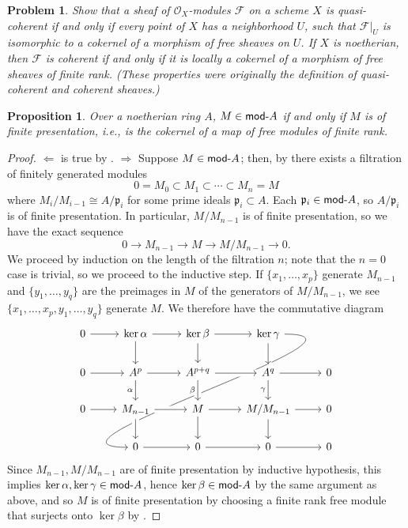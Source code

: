\documentclass[12pt,letterpaper]{article}
\newtheorem{problem}{Problem}[section]
\newtheorem{proposition}{Proposition}
\theoremstyle{definition}
\theoremstyle{remark}
\numberwithin{equation}{section}
\numberwithin{figure}{problem}
\newcommand{\FF}{\mathscr{F}}
\newcommand{\OO}{\mathcal{O}}
\newcommand{\Mod}{\mathsf{mod}\mathchar`-}
\begin{document}
\begin{problem}
  Show that a sheaf of $\OO_X$-modules $\FF$ on a scheme $X$ is quasi-coherent if and only if every point of $X$ has a neighborhood $U$, such that $\FF\vert_U$ is isomorphic to a cokernel of a morphism of free sheaves on $U$. If $X$ is noetherian, then $\FF$ is coherent if and only if it is locally a cokernel of a morphism of free sheaves of finite rank. (These properties were originally the definition of quasi-coherent and coherent sheaves.)
\end{problem}
\begin{proposition}\label{noethfpfg}
  Over a noetherian ring $A$, $M \in \Mod A$ if and only if $M$ is of finite presentation, i.e., is the cokernel of a map of free modules of finite rank.
\end{proposition}
\begin{proof}
  $\Leftarrow$ is true by \cite[Prop.~2.3]{AM69}. $\Rightarrow$ Suppose $M \in \Mod A$; then, by \cite[Thm.~7.6]{Rei95} there exists a filtration of finitely generated modules
  \begin{equation*}
    0 = M_0 \subset M_1 \subset \cdots \subset M_n = M
  \end{equation*}
  where $M_i/M_{i-1} \cong A/\mathfrak{p}_i$ for some prime ideals $\mathfrak{p}_i \subset A$. Each $\mathfrak{p}_i \in \Mod A$, so $A/\mathfrak{p}_i$ is of finite presentation. In particular, $M/M_{n-1}$ is of finite presentation, so we have the exact sequence
  \begin{equation*}
    0 \longrightarrow M_{n-1} \longrightarrow M \longrightarrow M/M_{n-1} \longrightarrow 0.
  \end{equation*}
  We proceed by induction on the length of the filtration $n$; note that the $n=0$ case is trivial, so we proceed to the inductive step. If $\{x_1,\ldots,x_p\}$ generate $M_{n-1}$ and $\{y_1,\ldots,y_q\}$ are the preimages in $M$ of the generators of $M/M_{n-1}$, we see $\{x_1,\ldots,x_p,y_1,\ldots,y_q\}$ generate $M$. We therefore have the commutative diagram
  \begin{equation*}
    \begin{tikzcd}
      0 \rar & \ker \alpha \rar\dar & \ker \beta \rar\dar & \ker \gamma\arrow[out=0, in=180, looseness=1.5]{dddll}\arrow[crossing over]{d}\\
      0 \rar & A^p \rar\dar[swap]{\alpha} & A^{p+q} \arrow[crossing over]{r}\arrow[crossing over]{d}[swap]{\beta} & A^q \rar\dar[swap]{\gamma} & 0\\
      0 \rar & M_{n-1} \arrow[crossing over]{r}\arrow[crossing over]{d} & M \rar\dar & M/M_{n-1} \rar\dar & 0\\
      & 0 \rar & 0 \rar & 0 \rar & 0
    \end{tikzcd}
  \end{equation*}
  Since $M_{n-1},M/M_{n-1}$ are of finite presentation by inductive hypothesis, this implies $\ker\alpha,\ker\gamma \in \Mod A$, hence $\ker\beta \in \Mod A$ by the same argument as above, and so $M$ is of finite presentation by choosing a finite rank free module that surjects onto $\ker\beta$ by \cite[Prop.~2.3]{AM69}.
\end{proof}
\end{document}
